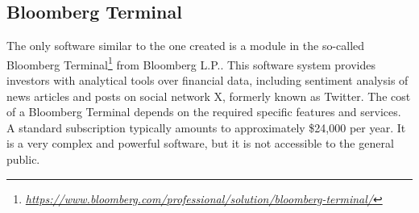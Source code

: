 \subsection{Bloomberg Terminal}
\label{subsec:bloomberg-terminal}

The only software similar to the one created is a module in the so-called Bloomberg Terminal\footnote{\href{https://www.bloomberg.com/professional/solution/bloomberg-terminal/}{\textit{https://www.bloomberg.com/professional/solution/bloomberg-terminal/}}} from Bloomberg L.P.. This software system provides investors with analytical tools over financial data, including sentiment analysis of news articles and posts on social network X, formerly known as Twitter. The cost of a Bloomberg Terminal depends on the required specific features and services. \linebreak A standard subscription typically amounts to approximately \$24,000 per year. It is a very complex and powerful software, but it is not accessible to the general public.

